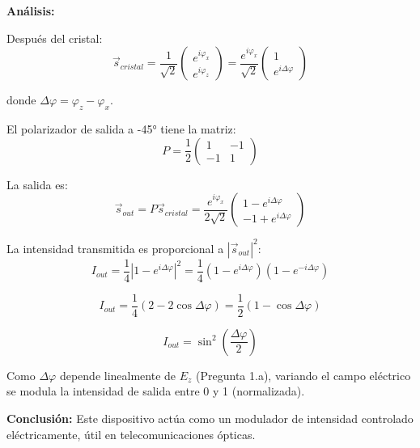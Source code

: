 \documentclass[12pt,a4paper]{article}
\begin{document}
\textbf{Análisis:}

Después del cristal:
\begin{equation}
\vec{s}_{cristal} = \frac{1}{\sqrt{2}} \begin{pmatrix} e^{i\varphi_x} \\ e^{i\varphi_z} \end{pmatrix} = \frac{e^{i\varphi_x}}{\sqrt{2}} \begin{pmatrix} 1 \\ e^{i\Delta\varphi} \end{pmatrix}
\end{equation}

donde $\Delta\varphi = \varphi_z - \varphi_x$.

El polarizador de salida a -45° tiene la matriz:
\begin{equation}
P = \frac{1}{2} \begin{pmatrix} 1 & -1 \\ -1 & 1 \end{pmatrix}
\end{equation}

La salida es:
\begin{equation}
\vec{s}_{out} = P \vec{s}_{cristal} = \frac{e^{i\varphi_x}}{2\sqrt{2}} \begin{pmatrix} 1 - e^{i\Delta\varphi} \\ -1 + e^{i\Delta\varphi} \end{pmatrix}
\end{equation}

La intensidad transmitida es proporcional a $|\vec{s}_{out}|^2$:
\begin{equation}
I_{out} = \frac{1}{4}|1 - e^{i\Delta\varphi}|^2 = \frac{1}{4}(1 - e^{i\Delta\varphi})(1 - e^{-i\Delta\varphi})
\end{equation}

\begin{equation}
I_{out} = \frac{1}{4}(2 - 2\cos\Delta\varphi) = \frac{1}{2}(1 - \cos\Delta\varphi)
\end{equation}

\begin{equation}
\boxed{I_{out} = \sin^2\left(\frac{\Delta\varphi}{2}\right)}
\end{equation}

Como $\Delta\varphi$ depende linealmente de $E_z$ (Pregunta 1.a), variando el campo eléctrico se modula la intensidad de salida entre 0 y 1 (normalizada).

\textbf{Conclusión:} Este dispositivo actúa como un modulador de intensidad controlado eléctricamente, útil en telecomunicaciones ópticas.
\end{document}
